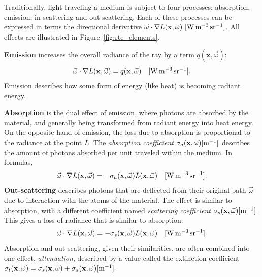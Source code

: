 Traditionally, light traveling a medium is subject to four processes: absorption, emission, in-scattering and out-scattering. Each of these processes can be expressed in terms the directional derivative $\vec{\omega} \cdot \nabla L(\mathbf{x}, \vec{\omega})  \ \siunitnospace{\watt \per \cubic \metre \per \steradian}$. All effects are illustrated in Figure~\ref{fig:rte_elements}.

\textbf{Emission} increases the overall radiance of the ray by a term $q(\mathbf{x}, \vec{\omega})$:
\begin{equation*}
\vec{\omega} \cdot \nabla L(\mathbf{x}, \vec{\omega}) = q(\mathbf{x}, \vec{\omega}) \siunit{\watt \per \cubic \metre \per \steradian}.
\end{equation*} 
Emission describes how some form of energy (like heat) is becoming radiant energy.

\textbf{Absorption} is the dual effect of emission, where photons are absorbed by the material, and generally being transformed from radiant energy into heat energy. On the opposite hand of emission, the loss due to absorption is proportional to the radiance at the point $L$. The \emph{absorption coefficient} $\sigma_a(\mathbf{x}, \vec{\omega})  [\SI{}{\per \metre}] $ describes the amount of photons absorbed per unit traveled within the medium. In formulas,
\begin{equation*}
\vec{\omega} \cdot \nabla L(\mathbf{x}, \vec{\omega}) = - \sigma_a(\mathbf{x}, \vec{\omega}) L(\mathbf{x}, \vec{\omega}) \siunit{\watt \per \cubic \metre \per \steradian}.
 \end{equation*}
\textbf{Out-scattering} describes photons that are deflected from their original path $\vec{\omega}$  due to interaction with the atoms of the material. The effect is similar to absorption, with a different coefficient named \emph{scattering coefficient} $\sigma_s(\mathbf{x}, \vec{\omega}) [\SI{}{\per \metre}]$. This gives a loss of radiance that is similar to absorption:
\begin{equation*}
\vec{\omega} \cdot \nabla L(\mathbf{x}, \vec{\omega}) = - \sigma_s(\mathbf{x}, \vec{\omega}) L(\mathbf{x}, \vec{\omega})
 \siunit{\watt \per \cubic \metre \per \steradian}.
\end{equation*}
Absorption and out-scattering, given their similarities, are often combined into one effect, \emph{attenuation}, described by a value called the extinction coefficient $\sigma_t(\mathbf{x}, \vec{\omega}) =\sigma_s(\mathbf{x}, \vec{\omega}) + \sigma_a(\mathbf{x}, \vec{\omega}) [\SI{}{\per \metre}]$.

